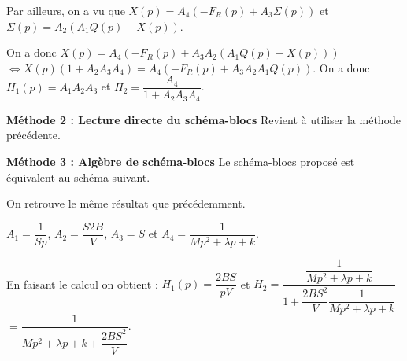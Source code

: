 \begin{multicols}{2}
\begin{corrige}
Par ailleurs, on a vu que $X(p)=A_4\left(-F_R(p)+A_3\Sigma(p)\right) $ et $\Sigma(p)=A_2\left(A_1Q(p)-X(p)\right)$. 

On a donc $X(p)=A_4\left(-F_R(p)+A_3  A_2\left(A_1Q(p)-X(p)\right)\right) $ $ \Leftrightarrow X(p)\left(1+A_2A_3A_4 \right)=A_4\left(-F_R(p)+A_3  A_2A_1Q(p)\right) $. On a donc 
$H_1(p)=A_1  A_2A_3$ et $H_2 = \dfrac{A_4}{1+ A_2A_3A_4 }$.

\textbf{Méthode 2 : Lecture directe du schéma-blocs}
Revient à utiliser la méthode précédente. 

\textbf{Méthode 3 : Algèbre de schéma-blocs}
Le schéma-blocs proposé est équivalent au schéma suivant. 

\footnotesize
\begin{center}
\end{center}
\normalsize

On retrouve le même résultat que précédemment. 


$A_1=\dfrac{1}{Sp}$,  $A_2 = \dfrac{S2B}{V} $,  $A_3 = S$  et $A_4 = \dfrac{1}{Mp^2  +\lambda p  + k}$.


En faisant le calcul on obtient : 
$H_1(p)=\dfrac{2BS}{pV}  $ et $H_2 = \dfrac{\dfrac{1}{Mp^2  +\lambda p  + k}}{1+ \dfrac{2BS^2}{V}\dfrac{1}{Mp^2  +\lambda p  + k} }$  $= \dfrac{1}{Mp^2  +\lambda p  + k+ \dfrac{2BS^2}{V} }$.

\end{corrige}
\else
\fi


\end{multicols}
